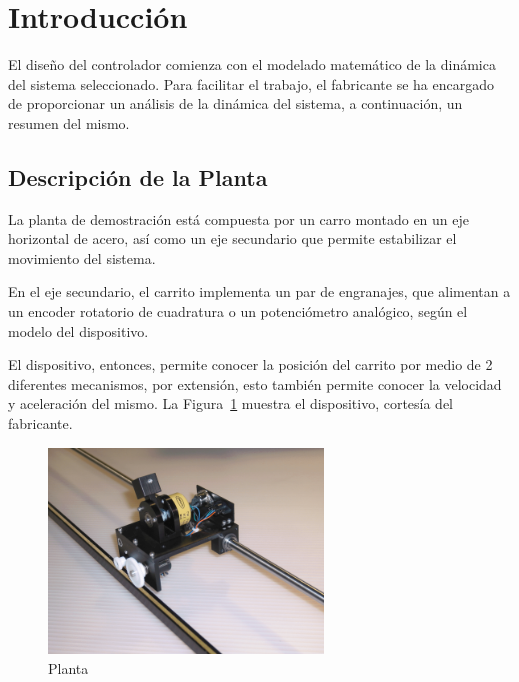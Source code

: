 \documentclass[12pt,a4paper]{article}
\begin{document}
	
    \tableofcontents
	
	\pagebreak

	  \section{Introducción} \label{sec:intro}
	
      El diseño del controlador comienza con el modelado matemático de la dinámica del sistema seleccionado. Para 
      facilitar el trabajo, el fabricante se ha encargado de proporcionar un análisis de la dinámica del sistema, 
      a continuación, un resumen del mismo. 

      \subsection{Descripción de la Planta}

        La planta de demostración está compuesta por un carro montado en un eje horizontal de acero, así como un 
        eje secundario que permite estabilizar el movimiento del sistema.

        En el eje secundario, el carrito implementa un par de engranajes, que alimentan a un encoder rotatorio de 
        cuadratura o un potenciómetro analógico, según el modelo del dispositivo. 

        El dispositivo, entonces, permite conocer la posición del carrito por medio de 2 diferentes mecanismos, 
        por extensión, esto también permite conocer la velocidad y aceleración del mismo. La Figura~\ref{fig:intro:planta}
        muestra el dispositivo, cortesía del fabricante.

        \vfill

        \begin{figure}[h]
          \centering
          \includegraphics[width=0.65\textwidth, keepaspectratio]{./Resources/IP01.png}
          \caption{Planta}
          \label{fig:intro:planta}
        \end{figure}
\end{document}
